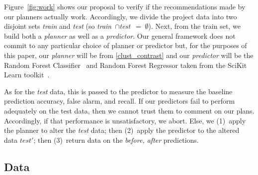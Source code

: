 \documentclass{sig-alternate}
\newcommand{\fig}[1]{Figure~\ref{fig:#1}}
\begin{document}
\fig{work} shows our proposal to verify if the recommendations made by our planners actually work. Accordingly, we divide the
project data  into two disjoint sets {\em train} and {\em test}
(so \mbox{{\em train} $\cap ${\em test} $=\;\emptyset$}).
Next, from the train set, we build both a {\em planner} as well
as a {\em  predictor}. Our general framework does not   commit to any particular choice of { planner} or { predictor} but, for the purposes of this paper, our {\em planner} will be from \ref{clust_contrast} and our {\em predictor} will be the Random Forest Classifier~\cite{Breiman2001} and Random Forest Regressor taken from the SciKit Learn toolkit~\cite{Pedregosa2012}.  

As for the {\em test} data, this is passed to the { predictor}
to measure the baseline prediction accuracy, false alarm, and recall.
If our { predictors} fail to perform adequately on the test data,
then we cannot trust them to comment on our plans. Accordingly,
if that performance is unsatisfactory, we abort.
Else, we (1)~apply the { planner} to alter the {\em test} data;
then (2)~apply the { predictor} to the altered data $test'$;
then (3)~return data on the {\em before, after} predictions.

\subsection{Data}







\end{document}
